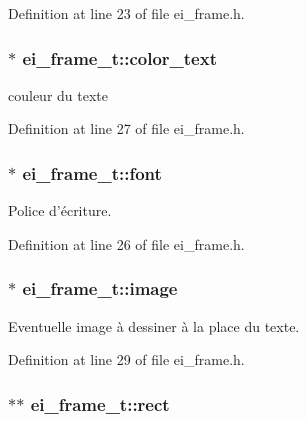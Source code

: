 Definition at line 23 of file ei\-\_\-frame.\-h.

\hypertarget{structei__frame__t_a8cc4e775e95a608a43ef23b56b94230b}{
\subsubsection[{color\-\_\-text}]{$\ast$ ei\-\_\-frame\-\_\-t\-::color\-\_\-text}}\label{structei__frame__t_a8cc4e775e95a608a43ef23b56b94230b}


couleur du texte 



Definition at line 27 of file ei\-\_\-frame.\-h.

\hypertarget{structei__frame__t_a4b28984e401b435c7232271fd36af2a8}{
\subsubsection[{font}]{$\ast$ ei\-\_\-frame\-\_\-t\-::font}}\label{structei__frame__t_a4b28984e401b435c7232271fd36af2a8}


Police d'écriture. 



Definition at line 26 of file ei\-\_\-frame.\-h.

\hypertarget{structei__frame__t_a2b7a1d80abca97ca7e0a6874e48d6c0a}{
\subsubsection[{image}]{$\ast$ ei\-\_\-frame\-\_\-t\-::image}}\label{structei__frame__t_a2b7a1d80abca97ca7e0a6874e48d6c0a}


Eventuelle image à dessiner à la place du texte. 



Definition at line 29 of file ei\-\_\-frame.\-h.

\hypertarget{structei__frame__t_a0825a838e0405ceb5f24bb43cb105113}{
\subsubsection[{rect}]{$\ast$$\ast$ ei\-\_\-frame\-\_\-t\-::rect}}\label{structei__frame__t_a0825a838e0405ceb5f24bb43cb105113}



